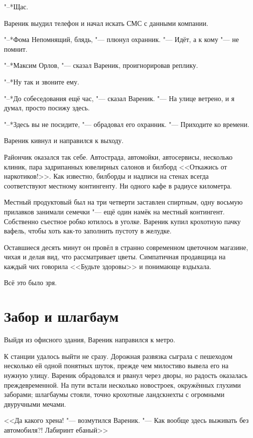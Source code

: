 "--*Щас.

Вареник выудил телефон и начал искать СМС с данными компании.

"--*Фома Непомнящий, блядь, "--- плюнул охранник.
"--- Идёт, а к кому "--- не помнит.

"--*Максим Орлов, "--- сказал Вареник, проигнорировав реплику.

"--*Ну так и звоните ему.

"--*До собеседования ещё час, "--- сказал Вареник.
"--- На улице ветрено, и я думал, просто посижу здесь.

"--*Здесь вы не посидите, "--- обрадовал его охранник.
"--- Приходите ко времени.

Вареник кивнул и направился к выходу.

Райончик оказался так себе.
Автострада, автомойки, автосервисы, несколько клиник, пара задрипанных ювелирных салонов и билборд <<Откажись от наркотиков!>>.
Как известно, билборды и надписи на стенах всегда соответствуют местному контингенту.
Ни одного кафе в радиусе километра.

Местный продуктовый был на три четверти заставлен спиртным, одну восьмую прилавков занимали семечки "--- ещё один намёк на местный контингент.
Собственно съестное робко ютилось в уголке.
Вареник купил крохотную пачку вафель, чтобы хоть как-то заполнить пустоту в желудке.

Оставшиеся десять минут он провёл в странно современном цветочном магазине, чихая и делая вид, что рассматривает цветы.
Симпатичная продавщица на каждый чих говорила <<Будьте здоровы>> и понимающе вздыхала.

Всё это было зря.

\section{Забор и шлагбаум}

Выйдя из офисного здания, Вареник направился к метро.

К станции удалось выйти не сразу.
Дорожная развязка сыграла с пешеходом несколько ей одной понятных шуток, прежде чем милостиво вывела его на нужную улицу.
Вареник обрадовался и рванул через дворы, но радость оказалась преждевременной.
На пути встали несколько новостроек, окружённых глухими заборами;
шлагбаумы стояли, точно крохотные ландскнехты с огромными двуручными мечами.

<<Да какого хрена! "--- возмутился Вареник.
"--- Как вообще здесь выживать без автомобиля?!
Лабиринт ебаный\ldotst >>

